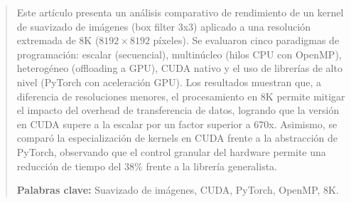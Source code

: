 
\begin{abstract}
Este artículo presenta un análisis comparativo de rendimiento de un kernel de suavizado de imágenes (box filter 3x3) aplicado a una resolución extremada de 8K ($8192 \times 8192$ píxeles). Se evaluaron cinco paradigmas de programación: escalar (secuencial), multinúcleo (hilos CPU con OpenMP), heterogéneo (offloading a GPU), CUDA nativo y el uso de librerías de alto nivel (PyTorch con aceleración GPU). Los resultados muestran que, a diferencia de resoluciones menores, el procesamiento en 8K permite mitigar el impacto del overhead de transferencia de datos, logrando que la versión en CUDA supere a la escalar por un factor superior a 670x. Asimismo, se comparó la especialización de kernels en CUDA frente a la abstracción de PyTorch, observando que el control granular del hardware permite una reducción de tiempo del 38\% frente a la librería generalista.

\textbf{Palabras clave:} Suavizado de imágenes, CUDA, PyTorch, OpenMP, 8K.
\end{abstract}